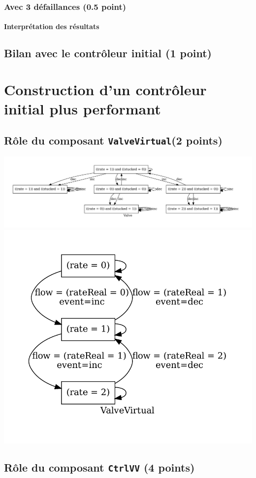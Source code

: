 \documentclass[a4paper]{book}
\begin{document}
\subsubsection{Avec 3 défaillances (0.5 point)}

\paragraph{Interprétation des résultats}

\subsection{Bilan avec le contrôleur initial (1 point)}

\section{Construction d'un contrôleur initial plus performant}
\subsection{Rôle du composant {\tt ValveVirtual}(2 points)}
\includegraphics[height=.2\textheight,width=.5\textwidth]{Graphs/Valve-modes.pdf}
\includegraphics[height=.2\textheight,width=.5\textwidth]{Graphs/ValveVirtual-modes.pdf}

\subsection{Rôle du composant {\tt CtrlVV} (4 points)}
\end{document}
